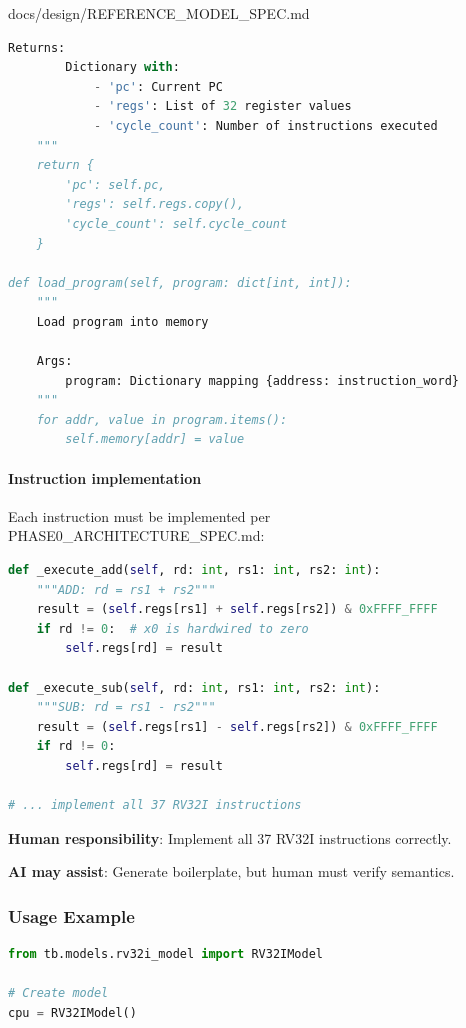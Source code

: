 \begin{relocated}{docs/design/REFERENCE_MODEL_SPEC.md}
\begin{lstlisting}[language=Python]
    Returns:
        Dictionary with:
            - 'pc': Current PC
            - 'regs': List of 32 register values
            - 'cycle_count': Number of instructions executed
    """
    return {
        'pc': self.pc,
        'regs': self.regs.copy(),
        'cycle_count': self.cycle_count
    }

def load_program(self, program: dict[int, int]):
    """
    Load program into memory

    Args:
        program: Dictionary mapping {address: instruction_word}
    """
    for addr, value in program.items():
        self.memory[addr] = value
\end{lstlisting}

\paragraph{Instruction implementation}\label{ds:ch:reference-model:instruction-implementation}

Each instruction must be implemented per
PHASE0\_\allowbreak{}ARCHITECTURE\_\allowbreak{}SPEC.md:

\begin{lstlisting}[language=Python]
def _execute_add(self, rd: int, rs1: int, rs2: int):
    """ADD: rd = rs1 + rs2"""
    result = (self.regs[rs1] + self.regs[rs2]) & 0xFFFF_FFFF
    if rd != 0:  # x0 is hardwired to zero
        self.regs[rd] = result

def _execute_sub(self, rd: int, rs1: int, rs2: int):
    """SUB: rd = rs1 - rs2"""
    result = (self.regs[rs1] - self.regs[rs2]) & 0xFFFF_FFFF
    if rd != 0:
        self.regs[rd] = result

# ... implement all 37 RV32I instructions
\end{lstlisting}

\textbf{Human responsibility}: Implement all 37 RV32I instructions
correctly.

\textbf{AI may assist}: Generate boilerplate, but human must verify
semantics.

\subsubsection{Usage Example}\label{ds:ch:reference-model:usage-example}

\begin{lstlisting}[language=Python]
from tb.models.rv32i_model import RV32IModel

# Create model
cpu = RV32IModel()


\end{lstlisting}
\end{relocated}
